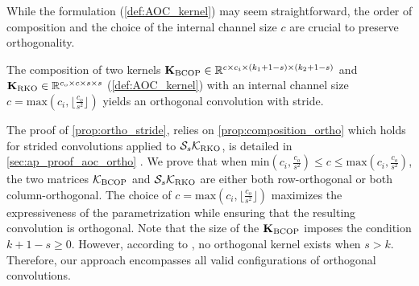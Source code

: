     While the formulation (\cref{def:AOC_kernel}) may seem straightforward, the order of composition and the choice of the internal channel size $c$ are crucial to preserve orthogonality.
    \begin{proposition}
        \label{prop:ortho_stride}
        The composition  of two kernels $\mathbf{K}_{\text{BCOP}} \in \mathbb{R}^{c \times c_i \times (k_1+1-s) \times (k_2+1-s)}$ and $\mathbf{K}_{\text{RKO}} \in \mathbb{R}^{c_o \times c \times s \times s}$ (\cref{def:AOC_kernel}) with an internal channel size $c = \text{max}(c_i, \lfloor\frac{c_o}{s^2}\rfloor)$ yields an orthogonal convolution with stride. %
    \end{proposition}
    
    The proof of \cref{prop:ortho_stride},  relies on  \cref{prop:composition_ortho} which holds for strided convolutions applied to $\mathcal{S}_{s} \mathcal{K}_{\text{RKO}}$, is detailed in \cref{sec:ap_proof_aoc_ortho} .
    We prove that when $\text{min}(c_i, \frac{c_o}{s^2})\leq c \leq \text{max}(c_i, \frac{c_o}{s^2})$, the two matrices $\mathcal{K}_{\text{BCOP}}$ and $\mathcal{S}_{s} \mathcal{K}_{\text{RKO}}$ are either both row-orthogonal or both column-orthogonal. The choice of $c = \text{max}(c_i, \lfloor\frac{c_o}{s^2}\rfloor)$ maximizes the expressiveness of the parametrization while ensuring that the resulting convolution is orthogonal. 
    Note that the size of the $\mathbf{K}_{\text{BCOP}}$ imposes the condition $k+1-s \geq 0$. However, according to \cite{achour2023existencestabilityscalabilityorthogonal}, no orthogonal kernel exists when $s > k$. Therefore, our approach encompasses all valid configurations of orthogonal convolutions.

